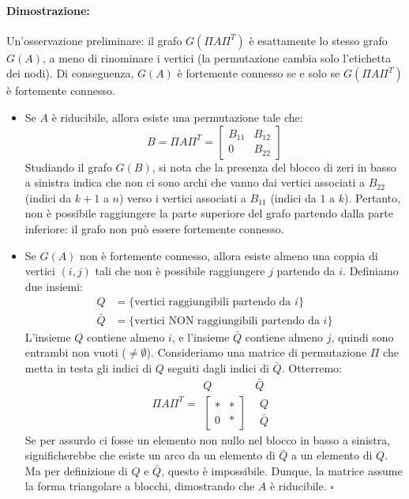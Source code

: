 \documentclass[a4paper,12pt]{article}
\begin{document}
	\paragraph{Dimostrazione:}
	Un'osservazione preliminare: il grafo $G(\Pi A \Pi^T)$ è esattamente lo stesso grafo $G(A)$, a meno di rinominare i vertici (la permutazione cambia solo l'etichetta dei nodi). Di conseguenza, $G(A)$ è fortemente connesso se e solo se $G(\Pi A \Pi^T)$ è fortemente connesso.
	
	\begin{itemize}
		\item [$(\implies)$] Se $A$ è riducibile, allora esiste una permutazione tale che:
		\[
		B = \Pi A \Pi^T = \begin{bmatrix} B_{11} & B_{12} \\ 0 & B_{22} \end{bmatrix}
		\]
		Studiando il grafo $G(B)$, si nota che la presenza del blocco di zeri in basso a sinistra indica che non ci sono archi che vanno dai vertici associati a $B_{22}$ (indici da $k+1$ a $n$) verso i vertici associati a $B_{11}$ (indici da $1$ a $k$). Pertanto, non è possibile raggiungere la parte superiore del grafo partendo dalla parte inferiore: il grafo non può essere fortemente connesso.
		
		\item [$(\impliedby)$] Se $G(A)$ non è fortemente connesso, allora esiste almeno una coppia di vertici $(i, j)$ tali che non è possibile raggiungere $j$ partendo da $i$. 
		Definiamo due insiemi:
		\begin{align*}
			Q &= \{ \text{vertici raggiungibili partendo da } i \} \\
			\bar{Q} &= \{ \text{vertici NON raggiungibili partendo da } i \}
		\end{align*}
		L'insieme $Q$ contiene almeno $i$, e l'insieme $\bar{Q}$ contiene almeno $j$, quindi sono entrambi non vuoti ($\neq \emptyset$).
		Consideriamo una matrice di permutazione $\Pi$ che metta in testa gli indici di $Q$ seguiti dagli indici di $\bar{Q}$. Otterremo:
		\[
		\Pi A \Pi^T = \begin{array}{cc}
			Q & \bar{Q} \\
			\begin{bmatrix} * & * \\ 0 & * \end{bmatrix} & \begin{array}{l} Q \\ \bar{Q} \end{array}
		\end{array}
		\]
		Se per assurdo ci fosse un elemento non nullo nel blocco in basso a sinistra, significherebbe che esiste un arco da un elemento di $\bar{Q}$ a un elemento di $Q$. Ma per definizione di $Q$ e $\bar{Q}$, questo è impossibile. Dunque, la matrice assume la forma triangolare a blocchi, dimostrando che $A$ è riducibile. $\square$
	\end{itemize}
	
\end{document}
